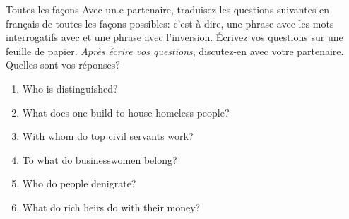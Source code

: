 \begin{frame}{Toutes les façons}
  Avec un.e partenaire, traduisez les questions suivantes en français \alert{de toutes les façons possibles}: c'est-à-dire, une phrase avec les mots interrogatifs avec  et une phrase avec l'inversion.
  Écrivez vos questions sur une feuille de papier.
  \emph{Après écrire vos questions}, discutez-en avec votre partenaire.
  Quelles sont vos réponses?
  \begin{enumerate}
    \item Who is distinguished?
    \item What does one build to house homeless people?
    \item With whom do top civil servants work?
    \item To what do businesswomen belong?
    \item Who do people denigrate?
    \item What do rich heirs do with their money?
  \end{enumerate}
\end{frame}